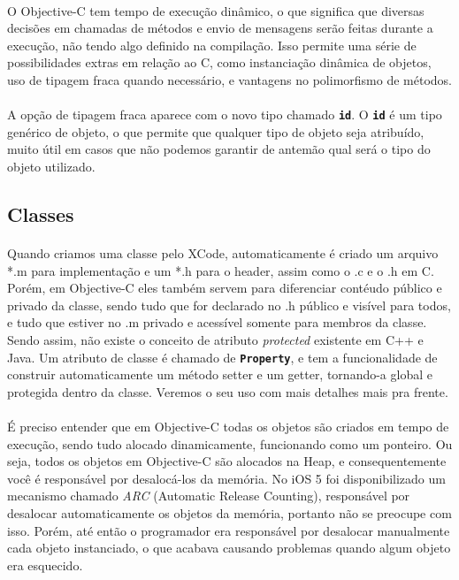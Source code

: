 \documentclass[a4paper,12pt,brazil,doubleside]{book}
\begin{document}
\paragraph{}O Objective-C tem tempo de execução dinâmico, o que significa que diversas decisões em chamadas de métodos e envio de mensagens serão feitas durante a execução, não tendo algo definido na compilação. Isso permite uma série de possibilidades extras em relação ao C, como instanciação dinâmica de objetos, uso de tipagem fraca quando necessário, e vantagens no polimorfismo de métodos.
\paragraph{}A opção de tipagem fraca aparece com o novo tipo chamado \texttt{\textbf{id}}. O \texttt{\textbf{id}} é um tipo genérico de objeto, o que permite que qualquer tipo de objeto seja atribuído, muito útil em casos que não podemos garantir de antemão qual será o tipo do objeto utilizado.

\bigskip 

\subsection{Classes}

\paragraph{}Quando criamos uma classe pelo XCode, automaticamente é criado um arquivo *.m para implementação e um *.h para o header, assim como o .c e o .h em C. Porém, em Objective-C eles também servem para diferenciar contéudo público e privado da classe, sendo tudo que for declarado no .h público e visível para todos, e tudo que estiver no .m privado e acessível somente para membros da classe. Sendo assim, não existe o conceito de atributo \emph{protected} existente em C++ e Java. Um atributo de classe é chamado de \texttt{\textbf{Property}}, e tem a funcionalidade de construir automaticamente um método setter e um getter, tornando-a global e protegida dentro da classe. Veremos o seu uso com mais detalhes mais pra frente.

\paragraph{}É preciso entender que em Objective-C todas os objetos são criados em tempo de execução, sendo tudo alocado dinamicamente, funcionando como um ponteiro. Ou seja, todos os objetos em Objective-C são alocados na Heap, e consequentemente você é responsável por desalocá-los da memória. No iOS 5 foi disponibilizado um mecanismo chamado \emph{ARC} (Automatic Release Counting), responsável por desalocar automaticamente os objetos da memória, portanto não se preocupe com isso. Porém, até então o programador era responsável por desalocar manualmente cada objeto instanciado, o que acabava causando problemas quando algum objeto era esquecido.
\end{document}
